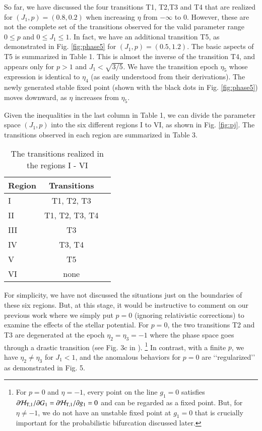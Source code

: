 \documentclass[useAMS,usenatbib,twocolumn]{mn2e}
\newcommand{\III}{{I\hspace{-.1em}I\hspace{-.1em}I}}
\newcommand{\II}{{I\hspace{-.1em}I}}
\newcommand{\IV}{{I\hspace{-.1em}V}}
\newcommand{\VI}{{V\hspace{-.1em}I}}
\begin{document}
So far, we have discussed the four transitions T1, T2,T3 and T4 that are realized for $(J_1,p)=(0.8,0.2)$ when increasing $\eta$ from $-\infty$ to 0.
 However, these are not the complete set of the transitions observed for the valid parameter range $0\le p$ and $0\le J_1\le 1$. 
In fact, we have an additional transition T5, as demonstrated in Fig. \ref{fig:phase5}  for $(J_1,p)=(0.5,1.2)$.
The basic aspects of T5 is summarized in Table 1. This is almost the inverse of the transition T4, and appears only for
 $p>1$ and $J_1<\sqrt{3/5}$. We have the transition epoch $\eta_5$ whose expression is identical to $\eta_4$ (as easily understood from their derivations).
The newly generated stable fixed point (shown with the black dots in Fig. \ref{fig:phase5}) moves downward, as $\eta$ increases from $\eta_5$.


 Given the inequalities in the last column in Table 1, we can divide the parameter space $(J_1,p)$ into the six different regions I to VI, as shown in Fig. \ref{fig:pj}. The transitions observed in each region are summarized in Table 3. 



\begin{table}
\caption{The transitions realized  in the regions I - \VI}
\label{tab:3}
\begin{tabular}{lcc}
\hline
Region & Transitions \\
\hline
 I & T1, T2, T3\\
\II & T1, T2, T3, T4 \\
\III & T3 \\
\IV & T3, T4\\
V & T5 \\
\VI & none\\
\hline
\end{tabular}
\end{table}


For simplicity, we have not discussed the situations just on the boundaries of these six regions. But, at this stage, it would be instructive to comment on our previous work \citep{iwasa2016} where we simply put $p=0$ (ignoring relativistic corrections) to examine the effects of the stellar potential.  For $p=0$, the two transitions T2 and T3 are degenerated at the epoch $\eta_2=\eta_3=-1$ where the phase space goes through a drastic transition (see Fig. 3c in \citealt{iwasa2016}). \footnote{For $p=0$ and $\eta=-1$, every point on  the line $g_1=0$ satisfies $\partial \mathcal{H}_{\rm T,1}/\partial G_1=\partial \mathcal{H}_{\rm T,1}/\partial g_1=0$ and can be regarded as a fixed point. But, for $\eta\ne -1$, we do not have an unstable fixed point at $g_1=0$ that is crucially important for the probabilistic bifurcation discussed later.} In contrast, with a finite $p$, we have $\eta_2\ne \eta_3$ for $J_1<1$, and the anomalous behaviors for $p=0$  are \lq\lq{}regularized\rq\rq{} as demonstrated in Fig. 5.
\end{document}

